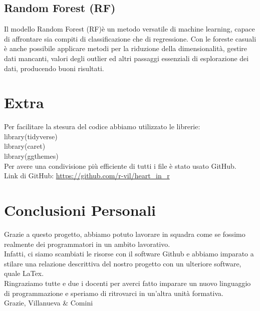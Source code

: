 \documentclass{article}
\begin{document}
\subsection {Random Forest (RF) }
Il modello Random Forest (RF)è un metodo versatile di machine learning, capace di affrontare sia compiti di classificazione che di regressione. Con le foreste casuali è anche possibile applicare metodi per la riduzione della dimensionalità, gestire dati mancanti, valori degli outlier ed altri passaggi essenziali di esplorazione dei dati, producendo buoni risultati.



\section { Extra }
Per facilitare la stesura del codice abbiamo utilizzato le librerie:\\
library(tidyverse)\\
library(caret)\\
library(ggthemes)\\
Per avere una condivisione più efficiente di tutti i file è stato usato GitHub.\\
Link di GitHub: \url{https://github.com/r-vil/heart_in_r}

\section{ Conclusioni Personali }
Grazie a questo progetto, abbiamo potuto lavorare in squadra come se fossimo realmente dei programmatori in un ambito lavorativo.\\
Infatti, ci siamo scambiati le risorse con il software Github e abbiamo imparato a stilare una relazione descrittiva del nostro progetto con un ulteriore software, quale LaTex.\\
Ringraziamo tutte e due i docenti per averci fatto imparare un nuovo linguaggio di programmazione e speriamo di ritrovarci in un'altra unità formativa.\\
Grazie, Villanueva \& Comini
\end{document}
